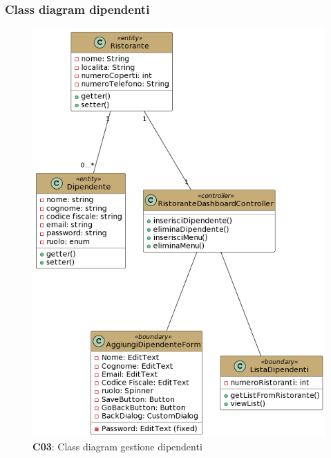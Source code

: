     \subsubsection{Class diagram dipendenti}
        \begin{figure}[H]
            \centering
            \includegraphics[scale=0.5]{assets/diagrammi/Class diagram di analisi/Gestione dipendenti.png}
            \caption{\textbf{C03}: Class diagram gestione dipendenti}\label{fig:Dipendenti}
        \end{figure}
    
